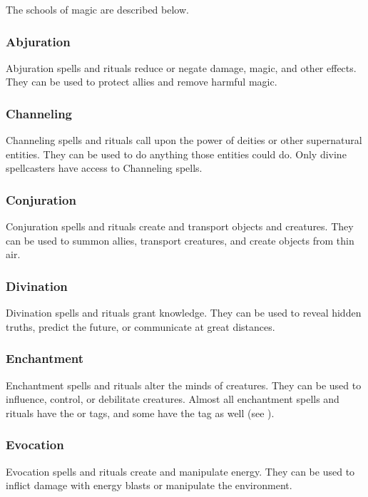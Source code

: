        The schools of magic are described below.

        \subsubsection{Abjuration}
            Abjuration spells and rituals reduce or negate damage, magic, and other effects.
            They can be used to protect allies and remove harmful magic.

        \subsubsection{Channeling}
            Channeling spells and rituals call upon the power of deities or other supernatural entities.
            They can be used to do anything those entities could do.
            Only divine spellcasters have access to Channeling spells.

        \subsubsection{Conjuration}
            Conjuration spells and rituals create and transport objects and creatures.
            They can be used to summon allies, transport creatures, and create objects from thin air.

        \subsubsection{Divination}
            Divination spells and rituals grant knowledge.
            They can be used to reveal hidden truths, predict the future, or communicate at great distances.

        \subsubsection{Enchantment}
            Enchantment spells and rituals alter the minds of creatures.
            They can be used to influence, control, or debilitate creatures.
            Almost all enchantment spells and rituals have the  or  tags,
            and some have the  tag as well (see ).

        \subsubsection{Evocation}
            Evocation spells and rituals create and manipulate energy.
            They can be used to inflict damage with energy blasts or manipulate the environment.

